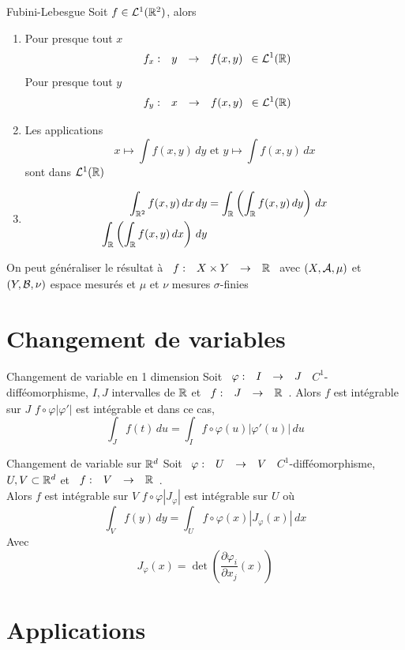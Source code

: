 \documentclass[]{report}
\begin{document}
\begin{tm}{Fubini-Lebesgue}{}
    Soit $f\in \mathcal{L}^1(\mathbb{R}^2)$, alors
    \begin{enumerate}[label=\roman*]
        \item Pour presque tout $x$
              \[\begin{array}{ccccc} f_x : & y & \to & f(x,y) \end{array}\in \mathcal{L}^1(\mathbb{R})\]
              Pour presque tout $y$
              \[\begin{array}{ccccc} f_y : & x & \to & f(x,y) \end{array}\in \mathcal{L}^1(\mathbb{R})\]
        \item Les applications
              \[x \mapsto \int f(x,y)\, dy\text{ et } y\mapsto \int f(x,y)\, dx\]
              sont dans $\mathcal{L}^1(\mathbb{R})$
        \item \begin{align*}
                  \int_{\mathbb{R}^2} f(x,y)\, dx\, dy & = \int_{\mathbb{R}} \left(\int_{\mathbb{R}} f(x,y)\, dy\right)\, dx \\
                  \int_{\mathbb{R}} \left(\int_{\mathbb{R}} f(x,y)\, dx\right)\, dy
              \end{align*}
    \end{enumerate}
    On peut généraliser le résultat à $\begin{array}{ccccc} f : & X\times Y & \to & \mathbb{R} \end{array}$ avec $(X,\mathcal{A},\mu)$ et $(Y,\mathcal{B},\nu)$ espace mesurés et $\mu$ et $\nu$ mesures $\sigma$-finies
\end{tm}

\section{Changement de variables}

\begin{ra}{Changement de variable en 1 dimension}{}
    Soit $\begin{array}{ccccc} \varphi : & I & \to & J \end{array}$ $C^1$-difféomorphisme, $I,J$ intervalles de $\mathbb{R}$ et $\begin{array}{ccccc} f : & J & \to & \mathbb{R} \end{array}$. Alors $f$ est intégrable sur $J$ \ssi $f\circ \varphi |\varphi'|$ est intégrable et dans ce cas,
    \[\int_J f(t)\, du=\int_I f\circ \varphi(u)\left|\varphi'(u)\right|\, du\]
\end{ra}

\begin{prop}{Changement de variable sur $\mathbb{R}^d$}{}
    Soit $\begin{array}{ccccc} \varphi : & U & \to & V \end{array}$ $C^1$-difféomorphisme, $U,V\subset \mathbb{R}^d$ et $\begin{array}{ccccc} f : & V & \to & \mathbb{R} \end{array}$.\\
    Alors $f$ est intégrable sur $V$ \ssi $f\circ \varphi |J_{\varphi}|$ est intégrable sur $U$ où
    \[\int_V f(y)\, dy=\int_U f\circ \varphi(x)\left|J_\varphi (x)\right|\, dx\]
    Avec
    \[J_\varphi(x)=\det \left(\frac{\partial \varphi_i}{\partial x_j}(x)\right)\]
\end{prop}

\section{Applications}
\end{document}
